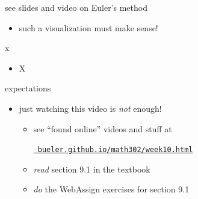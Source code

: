 \documentclass[urlcolor=blue,dvipsnames]{beamer}
\begin{document}
\begin{frame}{see slides and video on Euler's method}
\begin{itemize}
    \begin{itemize}
    \item such a visualization must make sense!
    \end{itemize}
\end{itemize}
\end{frame}


\begin{frame}{x}

\begin{itemize}
\item X
\end{itemize}
\end{frame}


\begin{frame}{expectations}

\begin{itemize}
\item just watching this video is \emph{not} enough!
     \begin{itemize}
     \item see ``found online'' videos and stuff at

     \centerline{\href{https://bueler.github.io/math302/week10.html}{\tt \color{cyan} bueler.github.io/math302/week10.html}}
     \item \emph{read} section 9.1 in the textbook
     \item \emph{do} the WebAssign exercises for section 9.1
     \end{itemize}
\end{itemize}
\end{frame}
\end{document}
